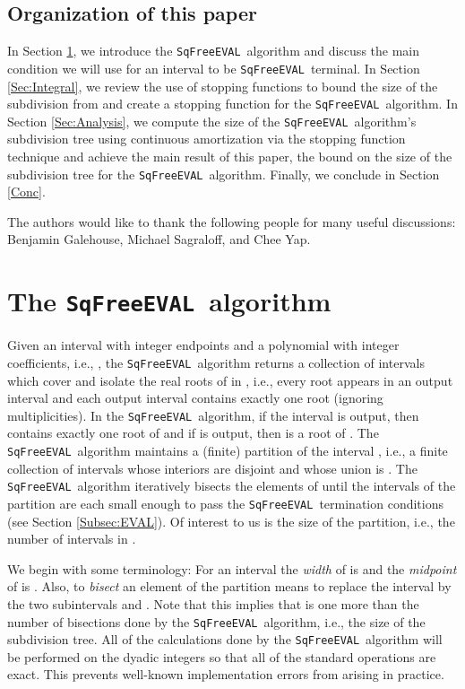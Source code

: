 \documentclass{amsart}
\theoremstyle{definition}
\newcommand{\EVAL}{\texttt{SqFreeEVAL}}
\begin{document}
\subsection{Organization of this paper}
In Section \ref{Sec:EVAL}, we introduce the \EVAL\ algorithm and discuss the main condition we will use for an interval to be \EVAL\ terminal.  In Section \ref{Sec:Integral}, we review the use of stopping functions to bound the size of the subdivision from \citep{Burr-Krahmer-Yap:integral:09} and create a stopping function for the \EVAL\ algorithm. In Section \ref{Sec:Analysis}, we compute the size of the \EVAL\ algorithm's subdivision tree using continuous amortization via the stopping function technique and achieve the main result of this paper, the  bound on the size of the subdivision tree for the \EVAL\ algorithm.  Finally, we conclude in Section \ref{Conc}.

The authors would like to thank the following people for many useful discussions: Benjamin Galehouse, Michael Sagraloff, and Chee Yap.

\section{The \EVAL\ algorithm}\label{Sec:EVAL}
Given an interval  with integer endpoints and a polynomial  with integer coefficients, i.e., , the \EVAL\ algorithm returns a collection of intervals which cover and isolate the real roots of  in , i.e., every root appears in an output interval and each output interval contains exactly one root (ignoring multiplicities).  In the \EVAL\ algorithm, if the interval  is output, then  contains exactly one root of  and if  is output, then  is a root of .  The \EVAL\ algorithm maintains a (finite) partition  of the interval , i.e., a finite collection of intervals whose interiors are disjoint and whose union is .  The \EVAL\ algorithm iteratively bisects the elements of  until the intervals of the partition  are each small enough to pass the \EVAL\ termination conditions (see Section \ref{Subsec:EVAL}).  Of interest to us is the size  of the partition, i.e., the number of intervals in .

We begin with some terminology: For an interval  the {\em width} of  is  and the {\em midpoint} of  is .  Also, to {\em bisect} an element of the partition  means to replace the interval  by the two subintervals  and .  Note that this implies that  is one more than the number of bisections done by the \EVAL\ algorithm, i.e., the size of the subdivision tree. All of the calculations done by the \EVAL\ algorithm will be performed on the dyadic integers  so that all of the standard operations are exact.  This prevents well-known implementation errors from arising in practice.
\end{document}
